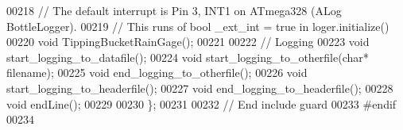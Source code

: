 \begin{DoxyCode}
00218     \textcolor{comment}{// The default interrupt is Pin 3, INT1 on ATmega328 (ALog BottleLogger).}
00219     \textcolor{comment}{// This runs of bool \_ext\_int = true in loger.initialize()}
00220     \textcolor{keywordtype}{void} TippingBucketRainGage();
00221     
00222     \textcolor{comment}{// Logging}
00223     \textcolor{keywordtype}{void} start\_logging\_to\_datafile();
00224     \textcolor{keywordtype}{void} start\_logging\_to\_otherfile(\textcolor{keywordtype}{char}* filename);
00225     \textcolor{keywordtype}{void} end\_logging\_to\_otherfile();
00226     \textcolor{keywordtype}{void} start\_logging\_to\_headerfile();
00227     \textcolor{keywordtype}{void} end\_logging\_to\_headerfile();
00228     \textcolor{keywordtype}{void} endLine();
00229 
00230 \};
00231 
00232 \textcolor{comment}{// End include guard}
00233 \textcolor{preprocessor}{#endif  }
00234 
\end{DoxyCode}
